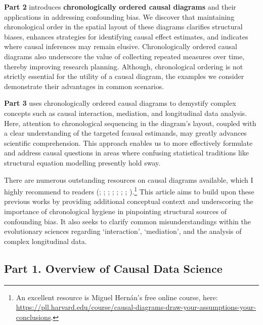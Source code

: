 \documentclass[
  singlecolumn,
  9pt]{article}
\begin{document}
\textbf{Part 2} introduces \textbf{chronologically ordered causal
diagrams} and their applications in addressing confounding bias. We
discover that maintaining chronological order in the spatial layout of
these diagrams clarifies structural biases, enhances strategies for
identifying causal effect estimates, and indicates where causal
inferences may remain elusive. Chronologically ordered causal diagrams
also underscore the value of collecting repeated measures over time,
thereby improving research planning. Although, chronological ordering is
not strictly essential for the utility of a causal diagram, the examples
we consider demonstrate their advantages in common scenarios.

\textbf{Part 3} uses chronologically ordered causal diagrams to
demystify complex concepts such as causal interaction, mediation, and
longitudinal data analysis. Here, attention to chronological sequencing
in the diagram's layout, coupled with a clear understanding of the
targeted fcausal estimands, may greatly advances scientific
comprehension. This approach enables us to more effectively formulate
and address causal questions in areas where confusing statistical
traditions like structural equation modelling presently hold sway.

There are numerous outstanding resources on causal diagrams available,
which I highly recommend to readers (; ;
;
;
;
; ; ).\footnote{An
  excellent resource is Miguel Hernán's free online course, here:
  \url{https://pll.harvard.edu/course/causal-diagrams-draw-your-assumptions-your-conclusions}.}
This article aims to build upon these previous works by providing
additional conceptual context and underscoring the importance of
chronological hygiene in pinpointing structural sources of confounding
bias. It also seeks to clarify common misunderstandings within the
evolutionary sciences regarding `interaction', `mediation', and the
analysis of complex longitudinal data.

\subsection{Part 1. Overview of Causal Data
Science}\label{part-1.-overview-of-causal-data-science}
\end{document}
